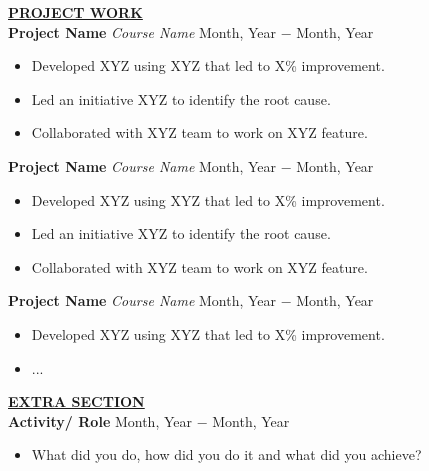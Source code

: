 \documentclass{article}
\begin{document}
%
%
\noindent \textbf{\underline{PROJECT WORK}} \\
\noindent \textbf{Project Name} \textit{Course Name} \hfill  Month, Year $-$ Month, Year
\begin{itemize}[noitemsep,nolistsep,leftmargin=*]
\item {Developed XYZ using XYZ that led to X\% improvement.}
\item {Led an initiative XYZ to identify the root cause.}
\item {Collaborated with XYZ team to work on XYZ feature. \\}
\end{itemize}

\noindent \textbf{Project Name} \textit{Course Name} \hfill  Month, Year $-$ Month, Year
\begin{itemize}[noitemsep,nolistsep,leftmargin=*]
\item {Developed XYZ using XYZ that led to X\% improvement.}
\item {Led an initiative XYZ to identify the root cause.}
\item {Collaborated with XYZ team to work on XYZ feature. \\}
\end{itemize}

\noindent \textbf{Project Name} \textit{Course Name} \hfill  Month, Year $-$ Month, Year
\begin{itemize}[noitemsep,nolistsep,leftmargin=*]
\item {Developed XYZ using XYZ that led to X\% improvement.}
\item {... \\}
\end{itemize}

\noindent \textbf{\underline{EXTRA SECTION}} \\
\noindent \textbf{Activity/ Role} \hfill Month, Year $-$ Month, Year
\begin{itemize}[noitemsep,nolistsep,leftmargin=*]
\item {What did you do, how did you do it and what did you achieve? \\}
\end{itemize}
\end{document}
